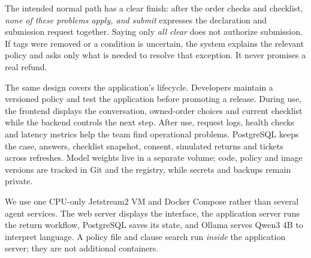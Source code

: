 \documentclass[10pt,letterpaper]{article}
\newcommand{\heading}[1]{\vspace{3pt}{\large\bfseries #1}\par\vspace{2pt}}
\begin{document}
The intended normal path has a clear finish: after the order checks and checklist,
\emph{none of these problems apply, and submit} expresses the declaration and submission
request together. Saying only \emph{all clear} does not authorize submission. If tags
were removed or a condition is uncertain, the system explains the relevant policy and
asks only what is needed to resolve that exception. It never promises a real refund.

The same design covers the application's lifecycle. Developers maintain a versioned
policy and test the application before promoting a release. During use, the frontend
displays the conversation, owned-order choices and current checklist while the backend
controls the next step. After use, request logs, health checks and latency metrics help
the team find operational problems. PostgreSQL keeps the case, answers, checklist
snapshot, consent, simulated returns and tickets across refreshes. Model weights live
in a separate volume; code, policy and image versions are tracked in Git and the
registry, while secrets and backups remain private.

\newpage
\heading{2. Technical architecture: four services, separate responsibilities}
We use one CPU-only Jetstream2 VM and Docker Compose rather than several agent
services. The web server displays the interface, the application server runs the
return workflow, PostgreSQL saves its state, and Ollama serves Qwen3 4B to interpret
language. A policy file and clause search run \emph{inside} the application server;
they are not additional containers.
\end{document}
